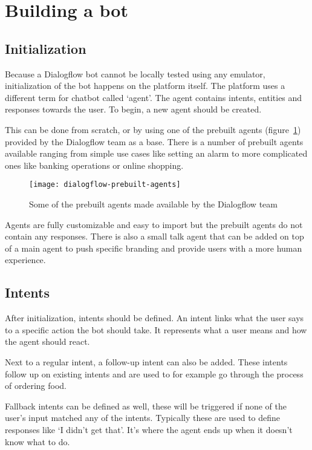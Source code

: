 \clearpage
\newpage

\section{Building a bot}

\subsection{Initialization}

Because a Dialogflow bot cannot be locally tested using any emulator, initialization of the bot happens on the platform itself. The platform uses a different term for chatbot called `agent'. The agent contains intents, entities and responses towards the user. To begin, a new agent should be created.

This can be done from scratch, or by using one of the prebuilt agents (figure~\ref{fig:dialogflow-prebuilt-agents}) provided by the Dialogflow team as a base. There is a number of prebuilt agents available ranging from simple use cases like setting an alarm to more complicated ones like banking operations or online shopping.

\begin{figure}[ht]
	\centering
	\texttt{[image: dialogflow-prebuilt-agents]}\label{fig:dialogflow-prebuilt-agents}
	\caption{Some of the prebuilt agents made available by the Dialogflow team}
\end{figure}

Agents are fully customizable and easy to import but the prebuilt agents do not contain any responses. There is also a small talk agent that can be added on top of a main agent to push specific branding and provide users with a more human experience.

\subsection{Intents}

After initialization, intents should be defined. An intent links what the user says to a specific action the bot should take. It represents what a user means and how the agent should react.

Next to a regular intent, a follow-up intent can also be added. These intents follow up on existing intents and are used to for example go through the process of ordering food.

Fallback intents can be defined as well, these will be triggered if none of the user's input matched any of the intents. Typically these are used to define responses like `I didn't get that'. It's where the agent ends up when it doesn't know what to do.

